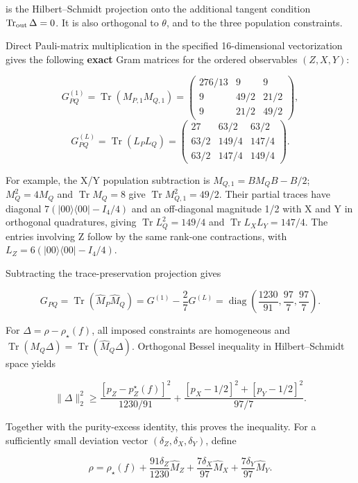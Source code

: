 \documentclass[
  10pt,
  a4paper,
]{article}
\begin{document}
is the Hilbert--Schmidt projection onto the additional tangent condition \(\operatorname{Tr}_{\rm out}\Delta=0\). It is also orthogonal to \(\theta\), and to the three population constraints.

Direct Pauli-matrix multiplication in the specified 16-dimensional vectorization gives the following \textbf{exact} Gram matrices for the ordered observables \((Z,X,Y)\):

\[
G^{(1)}_{PQ}=\operatorname{Tr}(M_{P,1}M_{Q,1})=
\begin{pmatrix}
276/13&9&9\\9&49/2&21/2\\9&21/2&49/2
\end{pmatrix},
\] \[
G^{(L)}_{PQ}=\operatorname{Tr}(L_PL_Q)=
\begin{pmatrix}
27&63/2&63/2\\63/2&149/4&147/4\\63/2&147/4&149/4
\end{pmatrix}.
\]

For example, the X/Y population subtraction is \(M_{Q,1}=BM_QB-B/2\); \(M_Q^2=4M_Q\) and \(\operatorname{Tr}M_Q=8\) give \(\operatorname{Tr}M_{Q,1}^2=49/2\). Their partial traces have diagonal \(7(|00\rangle\langle00|-I_4/4)\) and an off-diagonal magnitude 1/2 with X and Y in orthogonal quadratures, giving \(\operatorname{Tr}L_Q^2=149/4\) and \(\operatorname{Tr}L_XL_Y=147/4\). The entries involving Z follow by the same rank-one contractions, with \(L_Z=6(|00\rangle\langle00|-I_4/4)\).

Subtracting the trace-preservation projection gives

\[
G_{PQ}=\operatorname{Tr}(\widehat M_P\widehat M_Q)
=G^{(1)}-\frac27G^{(L)}
=\operatorname{diag}\!\left(\frac{1230}{91},\frac{97}{7},\frac{97}{7}\right).
\]

For \(\Delta=\rho-\rho_\star(f)\), all imposed constraints are homogeneous and \(\operatorname{Tr}(M_Q\Delta)=\operatorname{Tr}(\widehat M_Q\Delta)\). Orthogonal Bessel inequality in Hilbert--Schmidt space yields

\[
\|\Delta\|_2^2\ge
\frac{[p_Z-p_Z^\star(f)]^2}{1230/91}
+\frac{[p_X-1/2]^2+[p_Y-1/2]^2}{97/7}.
\]

Together with the purity-excess identity, this proves the inequality. For a sufficiently small deviation vector \((\delta_Z,\delta_X,\delta_Y)\), define

\[
\rho=\rho_\star(f)+\frac{91\delta_Z}{1230}\widehat M_Z+
\frac{7\delta_X}{97}\widehat M_X+
\frac{7\delta_Y}{97}\widehat M_Y.
\]
\end{document}
